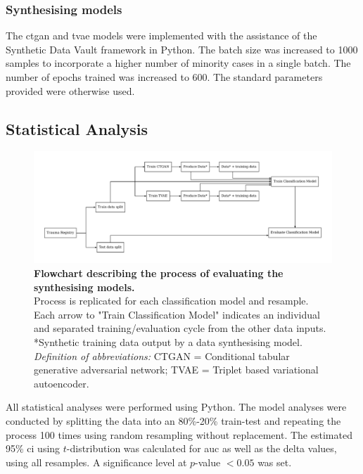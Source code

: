\documentclass[12pt, a4paper]{article}
\begin{document}
\subsubsection*{Synthesising models}
The \acrfull{ctgan} \cite{xu_modeling_2019} and \acrfull{tvae} \cite{ishfaq_tvae_2018} models were implemented with the assistance of the Synthetic Data Vault framework \cite{patki_sdv_2016} in Python. The batch size was increased to 1000 samples to incorporate a higher number of minority cases in a single batch. The number of epochs trained was increased to 600. The standard parameters provided were otherwise used.

\subsection{Statistical Analysis}
\begin{figure}[h]
    \centering
    \includegraphics[width=\textwidth]{figures/model_flowchart.pdf}
    \caption{\textbf{Flowchart describing the process of evaluating the synthesising models.}\\
        Process is replicated for each classification model and resample. Each arrow to "Train Classification Model" indicates an individual and separated training/evaluation cycle from the other data inputs.\\
        *Synthetic training data output by a data synthesising model.\\
        \textit{Definition of abbreviations:} CTGAN = Conditional tabular generative adversarial network; TVAE = Triplet based variational autoencoder.}
    \label{fig:modelflowchart}
\end{figure}

All statistical analyses were performed using Python. The model analyses were conducted by splitting the data into an 80\%-20\% train-test and repeating the process 100 times using random resampling without replacement. The estimated 95\% \acrfull{ci} using $t$-distribution was calculated for \acrfull{auc} as well as the delta values, using all resamples. A significance level at $p$-value $< 0.05$ was set.
\end{document}
